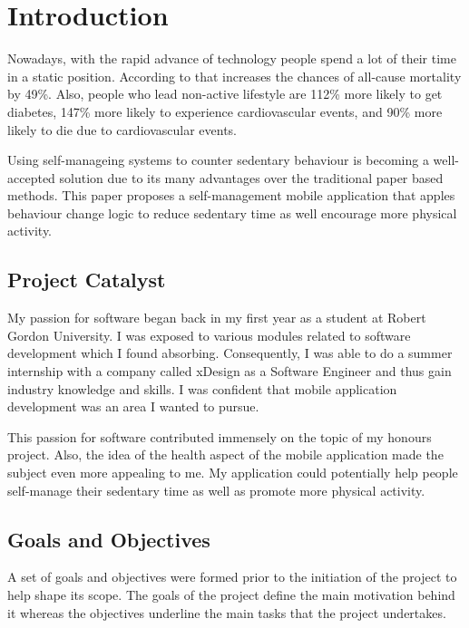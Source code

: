 \chapter{Introduction}
\label{Chapter:Introduction}
Nowadays, with the rapid advance of technology people spend a lot of their time in a static position. According to \citet{wilmot2012} that increases the chances of all-cause mortality by 49\%.  Also, people who lead non-active lifestyle are 112\% more likely to get diabetes, 147\% more likely to experience cardiovascular events, and 90\% more likely to die due to cardiovascular events. 
    
Using self-manageing systems to counter sedentary behaviour is becoming a well-accepted solution due to its many advantages over the traditional paper based methods. This paper proposes a self-management mobile application that apples behaviour change logic to reduce sedentary time as well encourage more physical activity. 
    
    \section{Project Catalyst}
    My passion for software began back in my first year as a student at Robert Gordon University. I was exposed to various modules related to software development which I found absorbing. Consequently, I was able to do a summer internship with a company called xDesign as a Software Engineer and thus gain industry knowledge and skills. I was confident that mobile application development was an area I wanted to pursue. 
    
    This passion for software contributed immensely on the topic of my honours project. Also, the idea of the health aspect of the mobile application made the subject even more appealing to me. My application could potentially help people self-manage their sedentary time as well as promote more physical activity. 
    
    
    \section{Goals and Objectives}
    A set of goals and objectives were formed prior to the initiation of the project to help shape its scope. The goals of the project define the main motivation behind it whereas the objectives underline the main tasks that the project undertakes.
    
